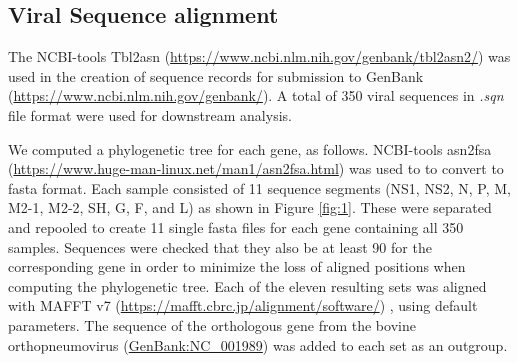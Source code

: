 \documentclass{article}
\begin{document}
\subsection{Viral Sequence alignment}
The NCBI-tools Tbl2asn (\url{https://www.ncbi.nlm.nih.gov/genbank/tbl2asn2/})
was used in the creation of sequence records for submission to GenBank (\url{https://www.ncbi.nlm.nih.gov/genbank/}).
A total of 350 viral sequences in \textit{.sqn} file format were used for downstream analysis.

We computed a phylogenetic tree for each gene, as follows.
NCBI-tools asn2fsa (\url{https://www.huge-man-linux.net/man1/asn2fsa.html}) was used to to convert to fasta format.
Each sample consisted of 11 sequence segments
(NS1, NS2, N, P, M, M2-1, M2-2, SH, G, F, and L) as shown in 
Figure \ref{fig:1}.
These were separated and repooled to create 11 single fasta files for each gene containing all 350 samples. 
Sequences were checked that they also be at least 90%
for the corresponding gene in order to minimize the loss of aligned positions when computing the phylogenetic tree. 
Each of the eleven resulting sets was aligned with MAFFT v7 (\url{https://mafft.cbrc.jp/alignment/software/})
\cite{katoh2013mafft},
using default  parameters.
The sequence of the orthologous gene from the bovine orthopneumovirus 
(\href{https://www.ncbi.nlm.nih.gov/nuccore/NC_001989}{GenBank:NC\_001989}) 
was added to each set as an outgroup. 
\end{document}
